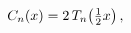 $\mathop{C_{n}\/}\nolimits\!\left(x\right)=2\mathop{T_{n}\/}\nolimits\!\left(%
\tfrac{1}{2}x\right),$